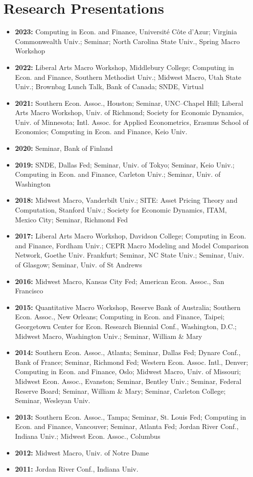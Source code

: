 \documentclass[10pt,letterpaper,en-US]{article}
\begin{document}
\section*{Research Presentations}
\begin{itemize}
\item \textbf{2023:} Computing in Econ. and Finance, Universit\'{e} C\^{o}te d'Azur; Virginia Commonwealth Univ.; Seminar; North Carolina State Univ., Spring Macro Workshop
\item \textbf{2022:} Liberal Arts Macro Workshop, Middlebury College; Computing in Econ. and Finance, Southern Methodist Univ.; Midwest Macro, Utah State Univ.; Brownbag Lunch Talk, Bank of Canada; SNDE, Virtual
\item \textbf{2021:} Southern Econ. Assoc., Houston; Seminar, UNC--Chapel Hill; Liberal Arts Macro Workshop, Univ. of Richmond; Society for Economic Dynamics, Univ. of Minnesota; Intl. Assoc. for Applied Econometrics, Erasmus School of Economics; Computing in Econ. and Finance, Keio Univ.
\item \textbf{2020:} Seminar, Bank of Finland
\item \textbf{2019:} SNDE, Dallas Fed; Seminar, Univ. of Tokyo; Seminar, Keio Univ.; Computing in Econ. and Finance, Carleton Univ.; Seminar, Univ. of Washington
\item \textbf{2018:} Midwest Macro, Vanderbilt Univ.; SITE: Asset Pricing Theory and Computation, Stanford Univ.; Society for Economic Dynamics, ITAM, Mexico City; Seminar, Richmond Fed
\item \textbf{2017:} Liberal Arts Macro Workshop, Davidson College; Computing in Econ. and Finance, Fordham Univ.; CEPR Macro Modeling and Model Comparison Network, Goethe Univ. Frankfurt; Seminar, NC State Univ.; Seminar, Univ. of Glasgow; Seminar, Univ. of St Andrews
\item \textbf{2016:} Midwest Macro, Kansas City Fed; American Econ. Assoc., San Francisco
\item \textbf{2015:} Quantitative Macro Workshop, Reserve Bank of Australia; Southern Econ. Assoc., New Orleans; Computing in Econ. and Finance, Taipei; Georgetown Center for Econ. Research Biennial Conf., Washington, D.C.; Midwest Macro, Washington Univ.; Seminar, William \& Mary
\item \textbf{2014:} Southern Econ. Assoc., Atlanta; Seminar, Dallas Fed; Dynare Conf., Bank of France; Seminar, Richmond Fed; Western Econ. Assoc. Intl., Denver; Computing in Econ. and Finance, Oslo; Midwest Macro, Univ. of Missouri; Midwest Econ. Assoc., Evanston; Seminar, Bentley Univ.; Seminar, Federal Reserve Board; Seminar, William \& Mary; Seminar, Carleton College; Seminar, Wesleyan Univ.
\item \textbf{2013:} Southern Econ. Assoc., Tampa; Seminar, St. Louis Fed; Computing in Econ. and Finance, Vancouver; Seminar, Atlanta Fed; Jordan River Conf., Indiana Univ.; Midwest Econ. Assoc., Columbus
\item \textbf{2012:} Midwest Macro, Univ. of Notre Dame
\item \textbf{2011:} Jordan River Conf., Indiana Univ.
\end{itemize}
\end{document}
